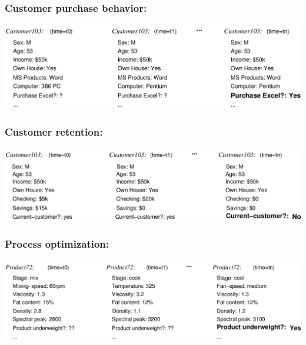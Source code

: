 \documentclass{beamer}
\begin{document}
\begin{frame}
\frametitle{Customer purchase behavior:}
\label{sec-2-5}

\includegraphics[width=.9\linewidth]{./image/customer-outcomes.png}
\end{frame}
\begin{frame}
\frametitle{Customer retention:}
\label{sec-2-6}


\includegraphics[width=.9\linewidth]{./image/bank-customer.png}
\end{frame}
\begin{frame}
\frametitle{Process optimization:}
\label{sec-2-7}

\includegraphics[width=.9\linewidth]{./image/process-outcomes.png}
\end{frame}
\end{document}
